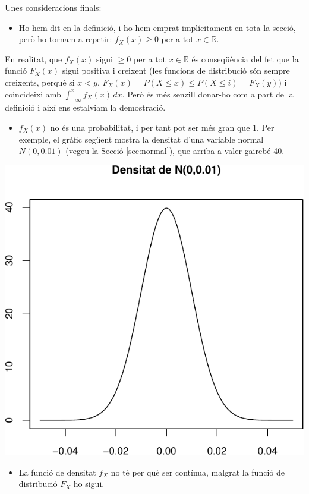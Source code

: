 \documentclass[
]{book}
\providecommand{\tightlist}{%
  \setlength{\itemsep}{0pt}\setlength{\parskip}{0pt}}
\renewcommand{\leq}{\leqslant}
\renewcommand{\geq}{\geqslant}
\newenvironment{rmdblock}[1]
  {
  \begin{itemize}
  \renewcommand{\labelitemi}{
    \raisebox{-.7\height}[0pt][0pt]{
      {\setkeys{Gin}{width=3em,keepaspectratio}\texttt{[image: Bioestadística-II\_files/figure-html/\#1]}}
    }
  }
  \setlength{\fboxsep}{1em}
  \begin{kframe}
  \item
  }
  {
  \end{kframe}
  \end{itemize}
  }
\newenvironment{rmdcorbes}
  {\begin{rmdblock}{corbes}}
  {\end{rmdblock}}
\theoremstyle{definition}
\theoremstyle{definition}
\theoremstyle{definition}
\theoremstyle{remark}
\begin{document}
Unes consideracions finals:

\begin{itemize}
\tightlist
\item
  Ho hem dit en la definició, i ho hem emprat implícitament en tota la secció, però ho tornam a repetir: \(f_X(x)\geq 0\) per a tot \(x\in \mathbb{R}\).
\end{itemize}

\begin{rmdcorbes}
En realitat, que \(f_X(x)\) sigui \(\geq 0\) per a tot \(x\in \mathbb{R}\) és conseqüència del fet que la funció \(F_X(x)\) sigui positiva i creixent (les funcions de distribució són sempre creixents, perquè si \(x<y\), \(F_X(x)=P(X\leq x)\leq P(X\leq i)=F_X(y)\)) i coincideixi amb \(\int_{-\infty}^x f_X(x)\,dx\). Però és més senzill donar-ho com a part de la definició i així ens estalviam la demostració.
\end{rmdcorbes}

\begin{itemize}
\tightlist
\item
  \(f_X(x)\) no és una probabilitat, i per tant pot ser més gran que 1. Per exemple, el gràfic següent mostra la densitat d'una variable normal \(N(0,0.01)\) (vegeu la Secció \ref{sec:normal}), que arriba a valer gairebé 40.
\end{itemize}

\begin{center}\includegraphics[width=0.6\linewidth]{Bioestadistica-II_files/figure-latex/unnamed-chunk-63-1} \end{center}

\begin{itemize}
\tightlist
\item
  La funció de densitat \(f_X\) no té per què ser contínua, malgrat la funció de distribució \(F_X\) ho sigui.
\end{itemize}
\end{document}
